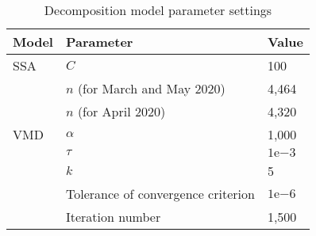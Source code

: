 \begin{table}[htb!]
    \centering
    \caption{Decomposition model parameter settings}
    \label{tab:settings}
    \begin{tabular}{lll}
        \hline
        \textbf{Model} & \textbf{Parameter} & \textbf{Value}  \\ \hline
        \ac{SSA} & $C$                          & 100 \\
            & $n$ (for March and May 2020) & 4,464 \\
            & $n$ (for April 2020)         & 4,320 \\ \hline
        \ac{VMD} & $\alpha$                     & 1,000 \\
            & $\tau$                       & $1\mathrm{e}{-3}$ \\
            & $k$                          & 5 \\
            & Tolerance of convergence criterion & $1\mathrm{e}{-6}$ \\
            & Iteration number             & 1,500 \\ \hline
    \end{tabular}
\end{table}


